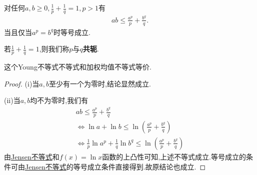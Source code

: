\documentclass[../../main.tex]{subfiles}%
\begin{document}
\begin{theorem}[Young不等式]\label{theorem:Young不等式}
对任何$a,b\geqslant 0,\frac{1}{p}+\frac{1}{q}=1,p>1$有
\begin{align*}
ab\leqslant \frac{a^p}{p}+\frac{b^q}{q}.
\end{align*}
当且仅当$a^p=b^q$时等号成立.
\end{theorem}
\begin{note}
若$\frac{1}{p}+\frac{1}{q}=1$,则我们称$p$与$q$\textbf{共轭}.\label{实数之间的共轭}
\end{note}
\begin{remark}
这个Young不等式不等式和加权均值不等式等价.
\end{remark}
\begin{proof}

(i)当$a,b$至少有一个为零时,结论显然成立.

(ii)当$a,b$均不为零时,我们有
\begin{gather*}
ab\leqslant \frac{a^p}{p}+\frac{b^q}{q}
\\
\Leftrightarrow \ln a+\ln b\leqslant \ln \left( \frac{a^p}{p}+\frac{b^q}{q} \right) 
\\
\Leftrightarrow \frac{1}{p}\ln a^p+\frac{1}{q}\ln b^q\leqslant \ln \left( \frac{a^p}{p}+\frac{b^q}{q} \right) 
\end{gather*}
由\hyperref[theorem:Jensen不等式]{Jensen不等式}和$f\left( x \right) =\ln x$函数的上凸性可知,上述不等式成立.等号成立的条件可由\hyperref[theorem:Jensen不等式]{Jensen不等式}的等号成立条件直接得到.故原结论也成立.   

\end{proof}
\end{document}
